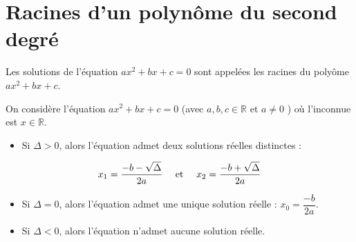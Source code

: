 \documentclass[12pt]{article}
\theoremstyle{break}
\begin{document}
\section{Racines d'un polynôme du second degré}
\begin{definition}{}{}
Les solutions de l'équation $a x^{2}+b x+c=0$ sont appelées les racines du polyôme $a x^{2}+b x+c$.
\end{definition}

\begin{proposition}{}{}
On considère l'équation $a x^{2}+b x+c=0$ (avec $a, b, c \in \mathbb{R}$ et $a \neq 0$ ) où l'inconnue est $x \in \mathbb{R}$.

\begin{itemize}
  \item Si $\Delta>0$, alors l'équation admet deux solutions réelles distinctes :
\end{itemize}

$$
x_{1}=\dfrac{-b-\sqrt{\Delta}}{2 a} \quad \text { et } \quad x_{2}=\dfrac{-b+\sqrt{\Delta}}{2 a}
$$

\begin{itemize}
  \item Si $\Delta=0$, alors l'équation admet une unique solution réelle : $x_{0}=\dfrac{-b}{2 a}$.
  \item Si $\Delta<0$, alors l'équation n'admet aucune solution réelle.
\end{itemize}
\end{proposition}
\end{document}
